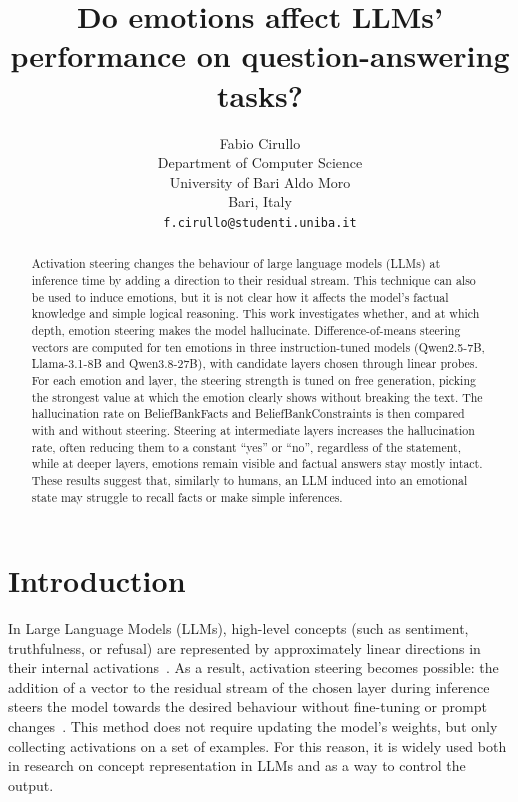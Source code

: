 \documentclass{article}
\title{Do emotions affect LLMs' performance on question-answering tasks?}
\author{
  Fabio Cirullo \\
  Department of Computer Science \\
  University of Bari Aldo Moro \\
  Bari, Italy \\
  \texttt{f.cirullo@studenti.uniba.it} \\
}
\begin{document}
\renewcommand{\today}{}
\maketitle

\begin{abstract}
Activation steering changes the behaviour of large language models (LLMs) at inference time by adding a direction to their residual stream. This technique can also be used to induce emotions, but it is not clear how it affects the model’s factual knowledge and simple logical reasoning. This work investigates whether, and at which depth, emotion steering makes the model hallucinate. Difference-of-means steering vectors are computed for ten emotions in three instruction-tuned models (Qwen2.5-7B, Llama-3.1-8B and Qwen3.8-27B), with candidate layers chosen through linear probes. For each emotion and layer, the steering strength is tuned on free generation, picking the strongest value at which the emotion clearly shows without breaking the text. The hallucination rate on BeliefBankFacts and BeliefBankConstraints is then compared with and without steering. Steering at intermediate layers increases the hallucination rate, often reducing them to a constant ``yes'' or ``no'', regardless of the statement, while at deeper layers, emotions remain visible and factual answers stay mostly intact. These results suggest that, similarly to humans, an LLM induced into an emotional state may struggle to recall facts or make simple inferences.
\end{abstract}

\section{Introduction}
In Large Language Models (LLMs), high-level concepts (such as sentiment, truthfulness, or refusal) are represented by approximately linear directions in their internal activations~\cite{park2024linearrep}. As a result, activation steering becomes possible: the addition of a vector to the residual stream of the chosen layer during inference steers the model towards the desired behaviour without fine-tuning or prompt changes~\cite{turner2024steeract}. This method does not require updating the model's weights, but only collecting activations on a set of examples. For this reason, it is widely used both in research on concept representation in LLMs and as a way to control the output.
\end{document}
